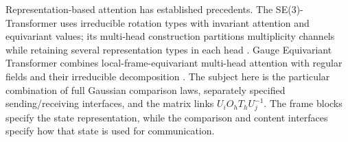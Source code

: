 \documentclass[twoside,11pt]{article}
\begin{document}
Representation-based attention has established precedents. The SE(3)-Transformer uses irreducible rotation types with invariant attention and equivariant values; its multi-head construction partitions multiplicity channels while retaining several representation types in each head \citep[Sec.~2.3 and App.~D.3]{fuchs2020se3}. Gauge Equivariant Transformer combines local-frame-equivariant multi-head attention with regular fields and their irreducible decomposition \citep[Secs.~4.1--4.2]{He2021GaugeEquivariantTransformer}. The subject here is the particular combination of full Gaussian comparison laws, separately specified sending/receiving interfaces, and the matrix links $U_iO_hT_hU_j^{-1}$. The frame blocks specify the state representation, while the comparison and content interfaces specify how that state is used for communication.
\end{document}
